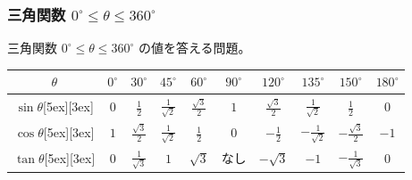 \documentclass[b5paper,10pt]{ltjsreport}
\newcounter{drillnum}
\newcommand{\resetdrill}{\setcounter{drillnum}{0}} %
\newcommand{\drilltitle}{問題項目}
\newcommand{\includedrill}[2]{ %
  \renewcommand{\drilltitle}{#1} %
  \pagestyle{drillstyle}
  
  \resetdrill
  \pagestyle{explanationstyle}
  \thispagestyle{explanationstyle}
}
\begin{document}
\vfil

\includedrill{三角比$0^{\circ}\leq\theta\leq 180^{\circ}$}{code/triangle_function_0-180}



\subsubsection{三角関数 $0^{\circ}\leq \theta \leq 360^{\circ}$}

三角関数
$0^{\circ}\leq \theta \leq 360^{\circ}$
の値を答える問題。


\vfill

\begin{center}
\begin{tabular}{|c||c|c|c|c|c|c|c|c|c|}
 \hline
 $\theta$ & $0^{\circ}$ & $30^{\circ}$ & $45^{\circ}$ & $60^{\circ}$ & $90^{\circ}$ & $120^{\circ}$ & $135^{\circ}$ & $150^{\circ}$ & $180^{\circ}$ \\
 \hline \hline
 $\sin{\theta}$\raisebox{0ex}[5ex][3ex]{} & $0$ & $\displaystyle \frac{1}{2}$ & $\displaystyle \frac{1}{\sqrt{2}}$ & $\displaystyle \frac{\sqrt{3}}{2}$ & $1$ & $\displaystyle \frac{\sqrt{3}}{2}$ & $\displaystyle \frac{1}{\sqrt{2}}$ & $\displaystyle \frac{1}{2}$ & $0$ \\
 \hline
 $\cos{\theta}$\raisebox{0ex}[5ex][3ex]{} & $1$ & $\displaystyle \frac{\sqrt{3}}{2}$ & $\displaystyle \frac{1}{\sqrt{2}}$ & $\displaystyle \frac{1}{2}$ & $0$ & $\displaystyle -\frac{1}{2}$ & $\displaystyle -\frac{1}{\sqrt{2}}$ & $\displaystyle -\frac{\sqrt{3}}{2}$ & $-1$ \\
 \hline
 $\tan{\theta}$\raisebox{0ex}[5ex][3ex]{} & $0$ & $\displaystyle \frac{1}{\sqrt{3}}$ & $1$ & $\displaystyle \sqrt{3}$ & なし & $\displaystyle -\sqrt{3}$ & $-1$ & $\displaystyle -\frac{1}{\sqrt{3}}$ & $0$ \\
 \hline
\end{tabular}
\end{center}

\vfil
\end{document}
